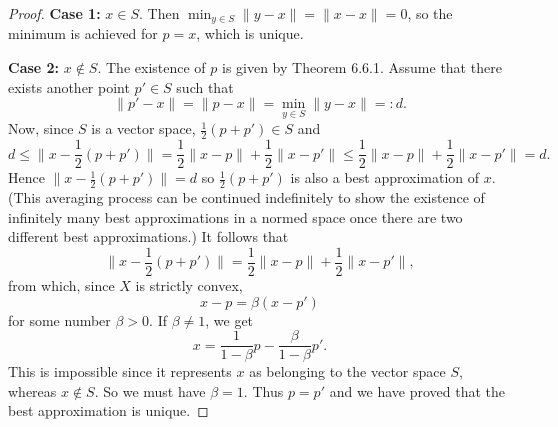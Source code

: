 \begin{proof}
\textbf{Case 1:} \( x \in S \). Then \( \min_{y \in S} \|y - x\| = \|x - x\| = 0 \), so the minimum is achieved for \( p = x \), which is unique.

\textbf{Case 2:} \( x \not\in S \). The existence of \( p \) is given by Theorem 6.6.1. Assume that there exists another point \( p' \in S \) such that 
\[ \|p' - x\| = \|p - x\| = \min_{y \in S} \|y - x\| =: d. \]
Now, since \( S \) is a vector space, \( \frac{1}{2}(p + p') \in S \) and
\[ d \leq \|x - \frac{1}{2}(p + p')\| = \frac{1}{2} \|x - p\| + \frac{1}{2} \|x - p'\| \leq \frac{1}{2} \|x - p\| + \frac{1}{2} \|x - p'\| = d. \]
Hence \( \|x - \frac{1}{2}(p + p')\| = d \) so \( \frac{1}{2}(p + p') \) is also a best approximation of \( x \). (This averaging process can be continued indefinitely to show the existence of infinitely many best approximations in a normed space once there are two different best approximations.) It follows that
\[ \|x - \frac{1}{2}(p + p')\| = \frac{1}{2} \|x - p\| + \frac{1}{2} \|x - p'\|, \]
from which, since \( X \) is strictly convex,
\[ x - p = \beta(x - p') \]
for some number \( \beta > 0 \). If \( \beta \neq 1 \), we get
\[ x = \frac{1}{1 - \beta} p - \frac{\beta}{1 - \beta} p'. \]
This is impossible since it represents \( x \) as belonging to the vector space \( S \), whereas \( x \not\in S \). So we must have \( \beta = 1 \). Thus \( p = p' \) and we have proved that the best approximation is unique.
\end{proof}
